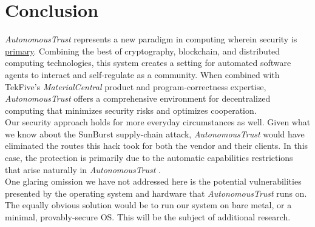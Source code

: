 \documentclass[10pt,twoside]{article}
\newcommand{\projectName}{\emph{AutonomousTrust }}
\newcommand{\analysisName}{\emph{MaterialCentral }}
\begin{document}
\section{Conclusion}\label{sec:conclusion}

\projectName represents a new paradigm in computing wherein security is \underline{primary}.
Combining the best of cryptography, blockchain, and distributed computing technologies, this system creates a setting for automated software agents to interact and self-regulate as a community.
When combined with TekFive's \analysisName product and program-correctness expertise, \projectName offers a comprehensive environment for decentralized computing that minimizes security risks and optimizes cooperation.
\\[10pt]


Our security approach holds for more everyday circumstances as well.
Given what we know about the SunBurst supply-chain attack, \projectName would have eliminated the routes this hack took for both the vendor and their clients.
In this case, the protection is primarily due to the automatic capabilities restrictions that arise naturally in \projectName.
\\[10pt]
One glaring omission we have not addressed here is the potential vulnerabilities presented by the operating system and hardware that \projectName runs on.
The equally obvious solution would be to run our system on bare metal, or a minimal, provably-secure OS. This will be the subject of additional research.


\end{document}
